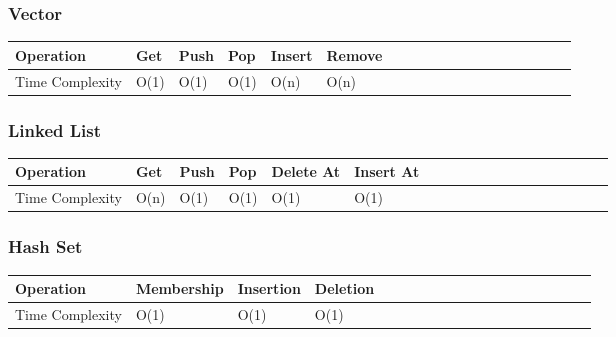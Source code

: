 \documentclass[11pt,oneside]{book}
\begin{document}
\subsubsection{Vector}

\begin{center}\begin{tabulary}{0.4\linewidth}{|l|l|l|l|l|l|l|l|l|l|l|l|l|l|l|l|l|l|l}\hline


  Operation &
  Get &
  Push &
  Pop &
  Insert &
  Remove\\
\hline


  Time Complexity &
  O(1) &
  O(1) &
  O(1) &
  O(n) &
  O(n)\\

\hline\end{tabulary}\end{center}

\subsubsection{Linked List}

\begin{center}\begin{tabulary}{0.4\linewidth}{|l|l|l|l|l|l|l|l|l|l|l|l|l|l|l|l|l|l|l}\hline


  Operation &
  Get &
  Push &
  Pop &
  Delete At &
  Insert At\\
\hline


  Time Complexity &
  O(n) &
  O(1) &
  O(1) &
  O(1) &
  O(1)\\

\hline\end{tabulary}\end{center}

\subsubsection{Hash Set}

\begin{center}\begin{tabulary}{0.4\linewidth}{|l|l|l|l|l|l|l|l|l|l|l|l|l|l|l|l|l|l|l}\hline


  Operation &
  Membership &
  Insertion &
  Deletion\\
\hline


  Time Complexity &
  O(1) &
  O(1) &
  O(1)\\

\hline\end{tabulary}\end{center}
\end{document}
